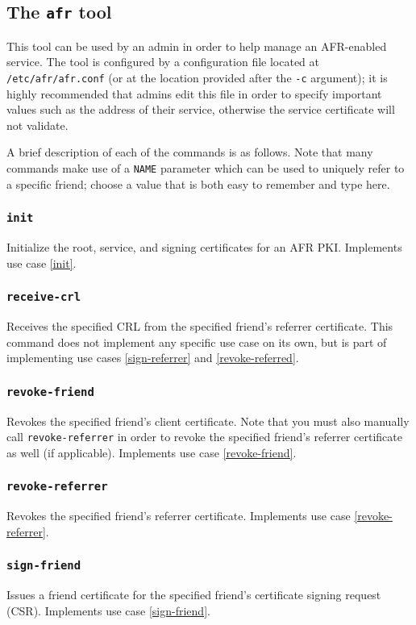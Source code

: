 \documentclass{article}
\begin{document}
\subsection{The \texttt{afr} tool}
This tool can be used by an admin in order to help manage an AFR-enabled service.  The tool is configured by a configuration file located at \texttt{/etc/afr/afr.conf} (or at the location provided after the \texttt{-c} argument); it is highly recommended that admins edit this file in order to specify important values such as the address of their service, otherwise the service certificate will not validate.

A brief description of each of the commands is as follows.  Note that many commands make use of a \texttt{NAME} parameter which can be used to uniquely refer to a specific friend; choose a value that is both easy to remember and type here.

\subsubsection{\texttt{init}}
Initialize the root, service, and signing certificates for an AFR PKI.  Implements use case \ref{init}.

\subsubsection{\texttt{receive-crl}}
Receives the specified CRL from the specified friend's referrer certificate.  This command does not implement any specific use case on its own, but is part of implementing use cases \ref{sign-referrer} and \ref{revoke-referred}.

\subsubsection{\texttt{revoke-friend}}
Revokes the specified friend's client certificate.  Note that you must also manually call \texttt{revoke-referrer} in order to revoke the specified friend's referrer certificate as well (if applicable).  Implements use case \ref{revoke-friend}.

\subsubsection{\texttt{revoke-referrer}}
Revokes the specified friend's referrer certificate.  Implements use case \ref{revoke-referrer}.

\subsubsection{\texttt{sign-friend}}
Issues a friend certificate for the specified friend's certificate signing request (CSR).  Implements use case \ref{sign-friend}.
\end{document}
